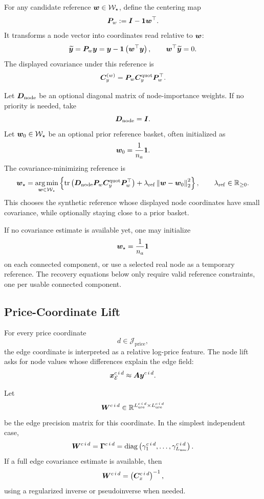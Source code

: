 For any candidate reference $\bm{w}\in\mathcal{W}_{\star}$, define the
centering map
\[
  \bm{P}_{w}
  :=
  \bm{I}
  -
  \mathbf{1}\bm{w}^{\top}.
\]
It transforms a node vector into coordinates read relative to $\bm{w}$:
\[
  \widetilde{\bm{y}}
  =
  \bm{P}_{w}\bm{y}
  =
  \bm{y}
  -
  \mathbf{1}
  \left(
    \bm{w}^{\top}\bm{y}
  \right),
  \qquad
  \bm{w}^{\top}\widetilde{\bm{y}}=0.
\]
The displayed covariance under this reference is
\[
  \bm{C}_{y}^{(w)}
  =
  \bm{P}_{w}
  \bm{C}_{y}^{\mathrm{quot}}
  \bm{P}_{w}^{\top}.
\]

Let $\bm{D}_{\mathrm{node}}$ be an optional diagonal matrix of node-importance
weights.  If no priority is needed, take
\[
  \bm{D}_{\mathrm{node}}=\bm{I}.
\]
Let $\bm{w}_0\in\mathcal{W}_{\star}$ be an optional prior reference basket,
often initialized as
\[
  \bm{w}_0
  =
  \frac{1}{n_a}\mathbf{1}.
\]
The covariance-minimizing reference is
\[
  \bm{w}_{\star}
  =
  \operatorname*{arg\,min}_{\bm{w}\in\mathcal{W}_{\star}}
  \left\{
    \operatorname{tr}
    \left(
      \bm{D}_{\mathrm{node}}
      \bm{P}_{w}
      \bm{C}_{y}^{\mathrm{quot}}
      \bm{P}_{w}^{\top}
    \right)
    +
    \lambda_{\mathrm{ref}}
    \left\|
      \bm{w}-\bm{w}_0
    \right\|_2^2
  \right\},
  \qquad
  \lambda_{\mathrm{ref}}\in\mathbb{R}_{\ge 0}.
\]
This chooses the synthetic reference whose displayed node coordinates have small
covariance, while optionally staying close to a prior basket.

If no covariance estimate is available yet, one may initialize
\[
  \bm{w}_{\star}
  =
  \frac{1}{n_a}\mathbf{1}
\]
on each connected component, or use a selected real node as a temporary
reference.  The recovery equations below only require valid reference
constraints, one per usable connected component.

\subsection{Price-Coordinate Lift}
\label{subsec:price-coordinate-lift}

For every price coordinate
\[
  d\in\mathcal{J}_{\mathrm{price}},
\]
the edge coordinate is interpreted as a relative log-price feature.  The node
lift asks for node values whose differences explain the edge field:
\[
  \bm{x}_{\mathcal{E}}^{c\,i\,d}
  \approx
  \bm{A}\bm{y}^{c\,i\,d}.
\]

Let
\[
  \bm{W}^{c\,i\,d}
  \in
  \mathbb{R}^{L_{\mathrm{use}}^{c\,i\,d}\times L_{\mathrm{use}}^{c\,i\,d}}
\]
be the edge precision matrix for this coordinate.  In the simplest independent
case,
\[
  \bm{W}^{c\,i\,d}
  =
  \bm{\Gamma}^{c\,i\,d}
  =
  \operatorname{diag}
  \left(
    \gamma_1^{c\,i\,d},
    \ldots,
    \gamma_{L_{\mathrm{use}}}^{c\,i\,d}
  \right).
\]
If a full edge covariance estimate is available, then
\[
  \bm{W}^{c\,i\,d}
  =
  \left(
    \bm{C}_{x}^{c\,i\,d}
  \right)^{-1},
\]
using a regularized inverse or pseudoinverse when needed.

